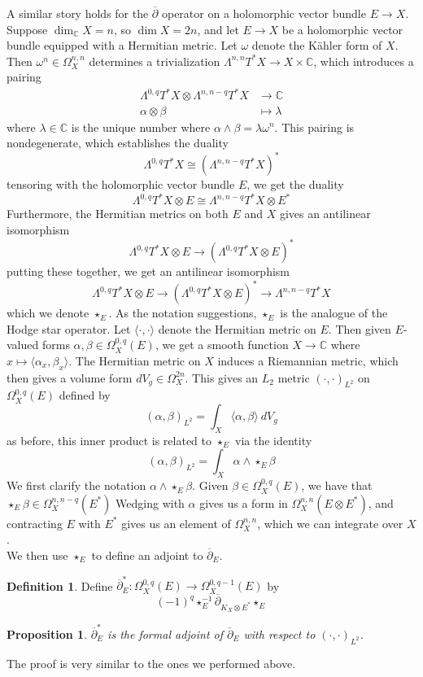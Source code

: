 \documentclass[psamsfonts, 12pt]{amsart}
\newtheorem{prop}[thm]{Proposition}
\theoremstyle{definition}
\newtheorem{defn}[thm]{Definition}
\theoremstyle{remark}
\newcommand{\C}{\mathbb{C}}
\newcommand{\dbar}{\overline{\partial}}
\newcommand{\inv}{^{-1}}
\begin{document}
%
A similar story holds for the $\dbar$ operator on a holomorphic vector bundle
$E \to X$. Suppose $\dim_\C X = n$, so $\dim X = 2n$, and let $E \to X$ be a
holomorphic vector bundle equipped with a Hermitian metric. Let $\omega$ denote
the K\"ahler form of $X$. Then $\omega^n \in \Omega^{n,n}_X$ determines a trivialization
$\Lambda^{n,n}T^*X \to X \times\C$, which introduces a pairing
\begin{align*}
\Lambda^{0,q}T^*X \otimes \Lambda^{n,n-q}T^*X &\to \C \\
\alpha\otimes\beta &\mapsto \lambda
\end{align*}
where $\lambda \in \C$ is the unique number where $\alpha\wedge\beta = \lambda\omega^n$.
This pairing is nondegenerate, which establishes the duality
\[
\Lambda^{0,q}T^*X \cong (\Lambda^{n,n-q}T^*X)^*
\]
tensoring with the holomorphic vector bundle $E$, we get the duality
\[
\Lambda^{0,q}T^*X \otimes E \cong \Lambda^{n,n-q}T^*X \otimes E^*
\]
Furthermore, the Hermitian metrics on both $E$ and $X$ gives an antilinear isomorphism
\[
\Lambda^{0,q}T^*X \otimes E \to (\Lambda^{0,q}T^*X \otimes E)^*
\]
putting these together, we get an antilinear isomorphism
\[
\Lambda^{0,q}T^*X \otimes E \to (\Lambda^{0,q}T^*X \otimes E)^* \to \Lambda^{n,n-q}T^*X
\]
which we denote $\star_E$. As the notation suggestions, $\star_E$ is the analogue of
the Hodge star operator. Let $\langle\cdot,\cdot\rangle$ denote the Hermitian metric
on $E$. Then given $E$-valued forms $\alpha,\beta \in \Omega^{0,q}_X(E)$, we get
a smooth function $X \to \C$ where $x\mapsto \langle\alpha_x,\beta_x\rangle$. The
Hermitian metric on $X$ induces a Riemannian metric, which then gives a volume form
$dV_g \in \Omega^{2n}_X$. This gives an $L_2$ metric $(\cdot,\cdot)_{L^2}$ on
$\Omega^{0,q}_X(E)$ defined by
\[
(\alpha,\beta)_{L^2} = \int_X \langle\alpha,\beta\rangle~dV_g
\]
as before, this inner product is related to $\star_E$ via the identity
\[
(\alpha,\beta)_{L^2} = \int_X\alpha\wedge\star_E\beta
\]
We first clarify the notation $\alpha\wedge\star_E\beta$. Given
$\beta\in\Omega^{0,q}_X(E)$, we have that $\star_E\beta \in \Omega^{n,n-q}_X(E^*)$
Wedging with $\alpha$ gives us a form in $\Omega^{n,n}_X(E \otimes E^*)$, and
contracting $E$ with $E^*$ gives us an element of $\Omega_X^{n,n}$, which we can
integrate over $X$. \\

We then use $\star_E$ to define an adjoint to $\dbar_E$.
%
\begin{defn}
Define $\dbar_E^* : \Omega^{0,q}_X(E) \to \Omega^{0,q-1}_X(E)$ by
\[
(-1)^q\star_E\inv\dbar_{K_X\otimes E^*}\star_E
\]
\end{defn}
%
\begin{prop}
$\dbar_E^*$ is the formal adjoint of $\dbar_E$ with respect to $(\cdot,\cdot)_{L^2}$.
\end{prop}
%
The proof is very similar to the ones we performed above. \\
\end{document}
